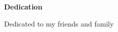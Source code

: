 

\begin{center}

\vspace*{5\baselineskip}
\textbf{\large Dedication}
\end{center}


\begin{flushleft}
\hspace{10mm}Dedicated to my friends and family 
\end{flushleft}





